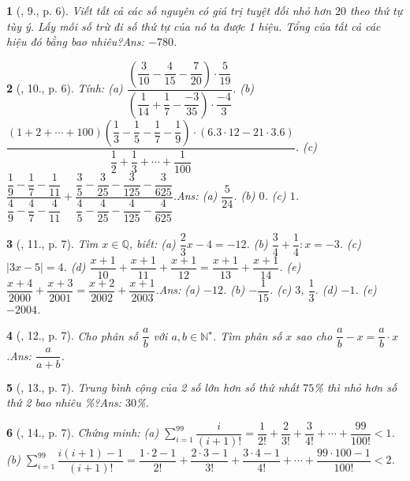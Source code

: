 \documentclass{article}
\newtheorem{baitoan}{}
\begin{document}
\begin{baitoan}[\cite{Binh_Toan_7_tap_1}, 9., p. 6]
	Viết tất cả các số nguyên có giá trị tuyệt đối nhỏ hơn $20$ theo thứ tự tùy ý. Lấy mỗi số trừ đi số thứ tự của nó ta được 1 hiệu. Tổng của tất cả các hiệu đó bằng bao nhiêu?\hfill{\sf Ans: $-780$.}
\end{baitoan}

\begin{baitoan}[\cite{Binh_Toan_7_tap_1}, 10., p. 6]
	Tính: (a) $\dfrac{\left(\dfrac{3}{10} - \dfrac{4}{15} - \dfrac{7}{20}\right)\cdot\dfrac{5}{19}}{\left(\dfrac{1}{14} + \dfrac{1}{7} - \dfrac{-3}{35}\right)\cdot\dfrac{-4}{3}}$. (b) $\dfrac{(1 + 2 + \cdots + 100)\left(\dfrac{1}{3} - \dfrac{1}{5} - \dfrac{1}{7} - \dfrac{1}{9}\right)\cdot(6.3\cdot 12 - 21\cdot 3.6)}{\dfrac{1}{2} + \dfrac{1}{3} + \cdots + \dfrac{1}{100}}$. (c) $\dfrac{\dfrac{1}{9} - \dfrac{1}{7} - \dfrac{1}{11}}{\dfrac{4}{9} - \dfrac{4}{7} - \dfrac{4}{11}} + \dfrac{\dfrac{3}{5} - \dfrac{3}{25} - \dfrac{3}{125} - \dfrac{3}{625}}{\dfrac{4}{5} - \dfrac{4}{25} - \dfrac{4}{125} - \dfrac{4}{625}}$.\hfill{\sf Ans: (a) $\dfrac{5}{24}$. (b) $0$. (c) $1$.}
\end{baitoan}

\begin{baitoan}[\cite{Binh_Toan_7_tap_1}, 11., p. 7]
	Tìm $x\in\mathbb{Q}$, biết: (a) $\dfrac{2}{3}x - 4 = -12$. (b) $\dfrac{3}{4} + \dfrac{1}{4}:x = -3$. (c) $|3x - 5| = 4$. (d) $\dfrac{x + 1}{10} + \dfrac{x + 1}{11} + \dfrac{x + 1}{12} = \dfrac{x + 1}{13} + \dfrac{x + 1}{14}$. (e) $\dfrac{x + 4}{2000} + \dfrac{x + 3}{2001} = \dfrac{x + 2}{2002} + \dfrac{x + 1}{2003}$.\hfill{\sf Ans: (a) $-12$. (b) $-\dfrac{1}{15}$. (c) $3$, $\dfrac{1}{3}$. (d) $-1$. (e) $-2004$.}
\end{baitoan}

\begin{baitoan}[\cite{Binh_Toan_7_tap_1}, 12., p. 7]
	Cho phân số $\dfrac{a}{b}$ với $a,b\in\mathbb{N}^\star$. Tìm phân số $x$ sao cho $\dfrac{a}{b} - x = \dfrac{a}{b}\cdot x$.\hfill{\sf Ans: $\dfrac{a}{a + b}$.}
\end{baitoan}

\begin{baitoan}[\cite{Binh_Toan_7_tap_1}, 13., p. 7]
	Trung bình cộng của 2 số lớn hơn số thứ nhất $75$\% thì nhỏ hơn số thứ 2 bao nhiêu \%?\hfill{\sf Ans: $30$\%.}
\end{baitoan}

\begin{baitoan}[\cite{Binh_Toan_7_tap_1}, 14., p. 7]
	Chứng minh: (a) $\sum_{i=1}^{99} \dfrac{i}{(i+1)!} = \dfrac{1}{2!} + \dfrac{2}{3!} + \dfrac{3}{4!} + \cdots + \dfrac{99}{100!} < 1$. (b) $\sum_{i=1}^{99} \dfrac{i(i + 1) - 1}{(i+1)!} = \dfrac{1\cdot 2 - 1}{2!} + \dfrac{2\cdot 3 - 1}{3!} + \dfrac{3\cdot 4 - 1}{4!} + \cdots + \dfrac{99\cdot 100 - 1}{100!} < 2$.	
\end{baitoan}
\end{document}
